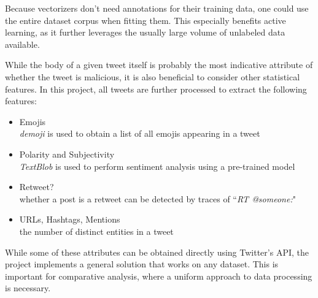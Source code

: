 \documentclass[a4paper,12pt]{article}
\begin{document}
Because vectorizers don't need annotations for their training data, one could use the entire dataset corpus when fitting them. This especially benefits active learning, as it further leverages the usually large volume of unlabeled data available.

While the body of a given tweet itself is probably the most indicative attribute of whether the tweet is malicious, it is also beneficial to consider other statistical features. In this project, all tweets are further processed to extract the following features:
\begin{itemize}
    \item Emojis\\
    \emph{demoji} is used to obtain a list of all emojis appearing in a tweet
    \item Polarity and Subjectivity\\
    \emph{TextBlob} is used to perform sentiment analysis using a pre-trained model
    \item Retweet?\\
    whether a post is a retweet can be detected by traces of ``\emph{RT @someone:}"
    \item URLs, Hashtags, Mentions\\
    the number of distinct entities in a tweet
\end{itemize}
While some of these attributes can be obtained directly using Twitter's API, the project implements a general solution that works on any dataset. This is important for comparative analysis, where a uniform approach to data processing is necessary.
\end{document}
